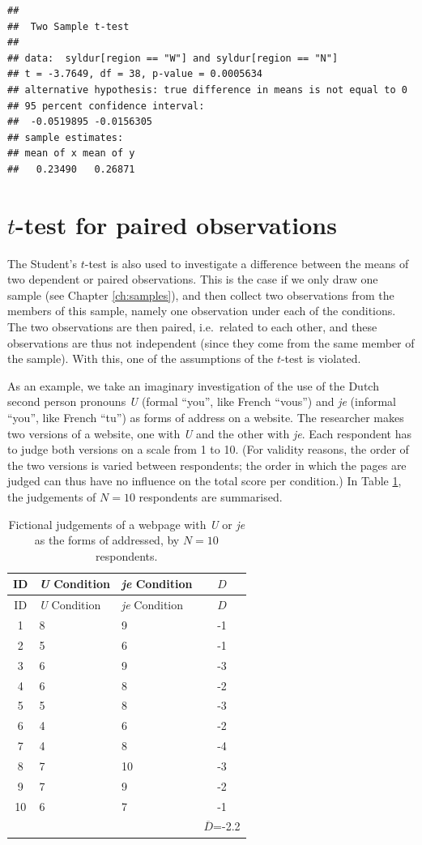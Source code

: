 \documentclass[
]{book}
\begin{document}
\begin{verbatim}
## 
##  Two Sample t-test
## 
## data:  syldur[region == "W"] and syldur[region == "N"]
## t = -3.7649, df = 38, p-value = 0.0005634
## alternative hypothesis: true difference in means is not equal to 0
## 95 percent confidence interval:
##  -0.0519895 -0.0156305
## sample estimates:
## mean of x mean of y 
##   0.23490   0.26871
\end{verbatim}

\hypertarget{sec:ttest-paired}{%
\section{\texorpdfstring{\(t\)-test for paired observations}{t-test for paired observations}}\label{sec:ttest-paired}}

The Student's \(t\)-test is also used to investigate a difference between the
means of two dependent or paired observations. This is the case if we only draw
one sample (see Chapter \ref{ch:samples}), and then collect two observations
from the members of this sample,
namely one observation under each of the conditions. The two
observations are then paired, i.e.~related to each other,
and these observations are thus not independent (since they come
from the same member of the sample). With this, one of the assumptions of
the \(t\)-test is violated.

As an example, we take an imaginary investigation of the use of the
Dutch second person pronouns \emph{U} (formal ``you'', like French ``vous'') and \emph{je} (informal ``you'', like French ``tu'') as forms of address on a website. The researcher makes two versions
of a website, one with \emph{U} and the other with \emph{je}. Each
respondent has to judge both versions on a scale from 1 to 10. (For validity
reasons, the order of the two versions is varied between respondents;
the order in which the pages are judged can thus
have no influence on the total score per condition.) In Table
\ref{tab:data-uje-paired}, the judgements of \(N=10\)
respondents are summarised.

\begin{longtable}[]{@{}cllc@{}}
\caption{\label{tab:data-uje-paired} Fictional judgements of a webpage
with \emph{U} or \emph{je} as the forms of addressed, by \(N=10\) respondents.}\tabularnewline
\toprule
ID & \emph{U} Condition & \emph{je} Condition & \(D\)\tabularnewline
\midrule
\endfirsthead
\toprule
ID & \emph{U} Condition & \emph{je} Condition & \(D\)\tabularnewline
\midrule
\endhead
1 & 8 & 9 & -1\tabularnewline
2 & 5 & 6 & -1\tabularnewline
3 & 6 & 9 & -3\tabularnewline
4 & 6 & 8 & -2\tabularnewline
5 & 5 & 8 & -3\tabularnewline
6 & 4 & 6 & -2\tabularnewline
7 & 4 & 8 & -4\tabularnewline
8 & 7 & 10 & -3\tabularnewline
9 & 7 & 9 & -2\tabularnewline
10 & 6 & 7 & -1\tabularnewline
& & & \(\overline{D}\)=-2.2\tabularnewline
\bottomrule
\end{longtable}
\end{document}
